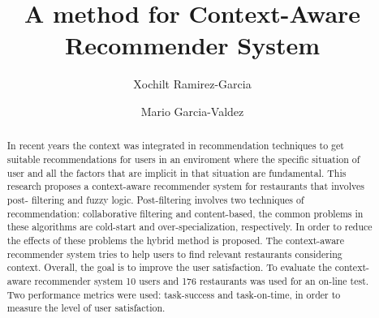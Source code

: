 \title{A method for Context-Aware Recommender System}

\subtitle{}


\author{Xochilt Ramirez-Garcia \and Mario Garcia-Valdez }



\maketitle

\begin{abstract} 

In recent years the context was integrated in recommendation
techniques to get suitable recommendations for users in an enviroment
where the specific situation of user and all the factors that are
implicit in that situation are fundamental. This research proposes a
context-aware recommender system for restaurants that involves post-
filtering and fuzzy logic. Post-filtering involves two techniques of
recommendation: collaborative filtering and content-based, the common
problems in these algorithms are cold-start and over-specialization, 
respectively. In order to reduce the effects of these problems 
the hybrid method is proposed. The context-aware
recommender system tries to help users to find relevant restaurants
considering context. Overall, the goal is to improve the user
satisfaction. To evaluate the context-aware recommender system 10
users and 176 restaurants was used for an on-line test. Two
performance metrics were used: task-success and task-on-time, in order
to measure the level of user satisfaction.
\end{abstract}

